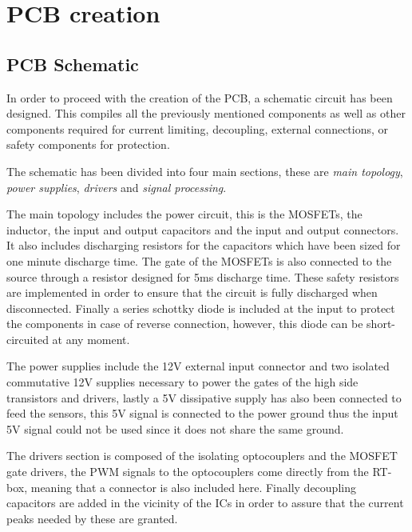 \section{PCB creation}
\subsection{PCB Schematic} \label{PCB_Schematic}
In order to proceed with the creation of the PCB, a schematic circuit has been designed. This compiles all the previously mentioned components as well as other components required for current limiting, decoupling, external connections, or safety components for protection.

The schematic has been divided into four main sections, these are \textit{main topology}, \textit{power supplies}, \textit{drivers} and \textit{signal processing}.

The main topology includes the power circuit, this is the MOSFETs, the inductor, the input and output capacitors and the input and output connectors. It also includes discharging resistors for the capacitors which have been sized for one minute discharge time. The gate of the MOSFETs is also connected to the source through a resistor designed for 5ms discharge time. These safety resistors are implemented in order to ensure that the circuit is fully discharged when disconnected. Finally a series schottky diode is included at the input to protect the components in case of reverse connection, however, this diode can be short-circuited at any moment. 

The power supplies include the 12V external input connector and two isolated commutative 12V supplies necessary to power the gates of the high side transistors and drivers, lastly a 5V dissipative supply has also been connected to feed the sensors, this 5V signal is connected to the power ground thus the input 5V signal could not be used since it does not share the same ground.

The drivers section is composed of the isolating optocouplers and the MOSFET gate drivers, the PWM signals to the optocouplers come directly from the RT-box, meaning that a connector is also included here. Finally decoupling capacitors are added in the vicinity of the ICs  in order to assure that the current peaks needed by these are granted. 

